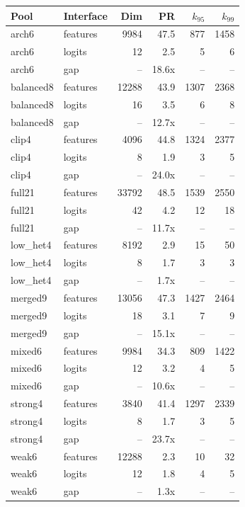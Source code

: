 \begin{tabular}{llrrrr}
\toprule
Pool & Interface & Dim & PR & $k_{95}$ & $k_{99}$ \\
\midrule
arch6 & features & 9984 & 47.5 & 877 & 1458 \\
arch6 & logits & 12 & 2.5 & 5 & 6 \\
arch6 & gap & -- & 18.6x & -- & -- \\
balanced8 & features & 12288 & 43.9 & 1307 & 2368 \\
balanced8 & logits & 16 & 3.5 & 6 & 8 \\
balanced8 & gap & -- & 12.7x & -- & -- \\
clip4 & features & 4096 & 44.8 & 1324 & 2377 \\
clip4 & logits & 8 & 1.9 & 3 & 5 \\
clip4 & gap & -- & 24.0x & -- & -- \\
full21 & features & 33792 & 48.5 & 1539 & 2550 \\
full21 & logits & 42 & 4.2 & 12 & 18 \\
full21 & gap & -- & 11.7x & -- & -- \\
low\_het4 & features & 8192 & 2.9 & 15 & 50 \\
low\_het4 & logits & 8 & 1.7 & 3 & 3 \\
low\_het4 & gap & -- & 1.7x & -- & -- \\
merged9 & features & 13056 & 47.3 & 1427 & 2464 \\
merged9 & logits & 18 & 3.1 & 7 & 9 \\
merged9 & gap & -- & 15.1x & -- & -- \\
mixed6 & features & 9984 & 34.3 & 809 & 1422 \\
mixed6 & logits & 12 & 3.2 & 4 & 5 \\
mixed6 & gap & -- & 10.6x & -- & -- \\
strong4 & features & 3840 & 41.4 & 1297 & 2339 \\
strong4 & logits & 8 & 1.7 & 3 & 5 \\
strong4 & gap & -- & 23.7x & -- & -- \\
weak6 & features & 12288 & 2.3 & 10 & 32 \\
weak6 & logits & 12 & 1.8 & 4 & 5 \\
weak6 & gap & -- & 1.3x & -- & -- \\
\bottomrule
\end{tabular}